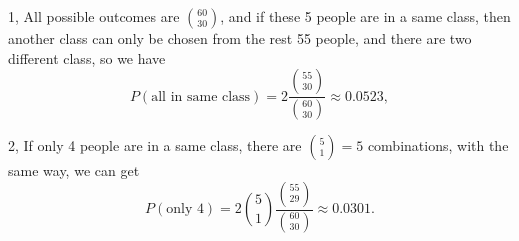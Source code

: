 \documentclass[12pt]{elegantbook}
\begin{document}
    \begin{solution}

        1, All possible outcomes are $\binom{60}{30}$, and if these 5 people are in a same class, then another class can only be chosen from the rest 55 people, and there are two different class, so we have
        \[
            P(\text{all in same class})=2\frac{\binom{55}{30}}{\binom{60}{30}}\approx 0.0523, 
        \]

        2, If only 4 people are in a same class, there are $\binom{5}{1}=5$ combinations, with the same way, we can get 
        \[
            P(\text{only 4})=2\binom{5}{1}\frac{\binom{55}{29}}{\binom{60}{30}}\approx 0.0301. 
        \]
    \end{solution}
\end{document}
